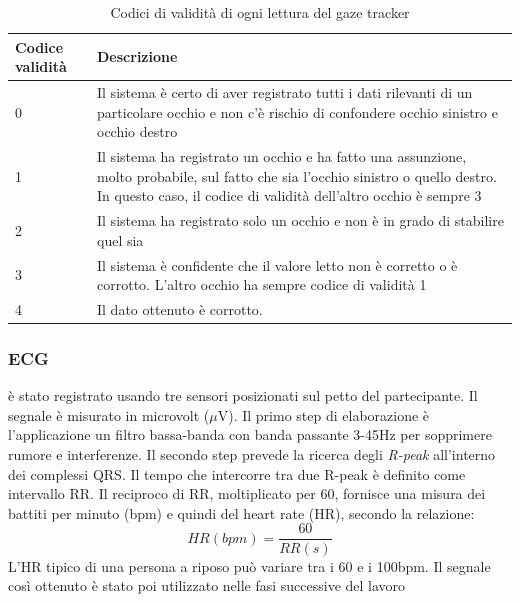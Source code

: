 \begin{table}[]
\begin{tabular}{p{}|p{}}
Codice validità   & Descrizione \\
\hline
0            & Il sistema è certo di aver registrato tutti i dati rilevanti di un particolare occhio
               e non c'è rischio di confondere occhio sinistro e occhio destro \\

1            & Il sistema ha registrato un occhio e ha fatto una assunzione,
               molto probabile, sul fatto che sia l'occhio sinistro o quello destro.
               In questo caso, il codice di validità dell'altro occhio è sempre 3 \\

2            & Il sistema ha registrato solo un occhio e non è in grado di stabilire quel sia \\

3            & Il sistema è confidente che il valore letto non è corretto o è corrotto.
               L'altro occhio ha sempre codice di validità 1 \\

4            & Il dato ottenuto è corrotto.  \\
\end{tabular}
\caption{Codici di validità di ogni lettura del gaze tracker}
\label{tab:gaze_validity_values}
\end{table}

\subsubsection{ECG}
è stato registrato usando tre sensori posizionati sul petto del partecipante. Il segnale è misurato in microvolt ($\mu$V).
Il primo step di elaborazione è l'applicazione un filtro bassa-banda con banda passante 3-45Hz per sopprimere rumore e interferenze.
Il secondo step prevede la ricerca degli \emph{R-peak} all'interno dei complessi QRS. Il tempo che intercorre tra due R-peak è definito come intervallo RR. Il reciproco di RR, moltiplicato per 60, fornisce una misura dei battiti per minuto (bpm) e quindi del heart rate (HR), secondo la relazione:
\begin{equation}
    HR(bpm) = \frac{60}{RR(s)}
\end{equation}
L'HR tipico di una persona a riposo può variare tra i 60 e i 100bpm.
Il segnale così ottenuto è stato poi utilizzato nelle fasi successive del lavoro

